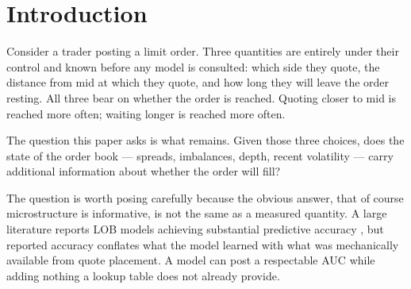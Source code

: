 \documentclass[11pt]{article}
\begin{document}
\begin{abstract}
We also compare model classes, holding the input representation fixed.
Gradient-boosted trees lead an LSTM on BTC and ETH under both representations,
but on SOL/USD the ordering flips with representation: trees lead by $0.0013$ on
109 features and trail by $0.0475$ on the 63-feature microstructure subset. We
draw no general ordering. An earlier version claimed model class was decisive;
that rested on a defective survival head.

Finally, we document five defects in our own pipeline, each of which produced
plausible, publishable-looking numbers, and the specific checks that caught
them. We consider this the most transferable part of the work.

\vspace{0.8em}
\noindent\textbf{Keywords:} limit order book, fill probability, crossing
proxy, market microstructure, gradient boosting, baselines, reproducibility

\vspace{0.3em}
\noindent\textbf{JEL:} G12, G14, C45, C61
\end{abstract}

\vspace{1em}

\section{Introduction}

Consider a trader posting a limit order. Three quantities are entirely under
their control and known before any model is consulted: which side they quote,
the distance from mid at which they quote, and how long they will leave the
order resting. All three bear on whether the order is reached. Quoting closer
to mid is reached more often; waiting longer is reached more often.

The question this paper asks is what remains. Given those three choices, does
the state of the order book --- spreads, imbalances, depth, recent volatility ---
carry additional information about whether the order will fill?

The question is worth posing carefully because the obvious answer, that of
course microstructure is informative, is not the same as a measured quantity.
A large literature reports LOB models achieving substantial predictive accuracy
\citep{zhang2019,maglaras2022,arroyo2024}, but reported accuracy conflates what
the model learned with what was mechanically available from quote placement.
A model can post a respectable AUC while adding nothing a lookup table does not
already provide.
\end{document}
